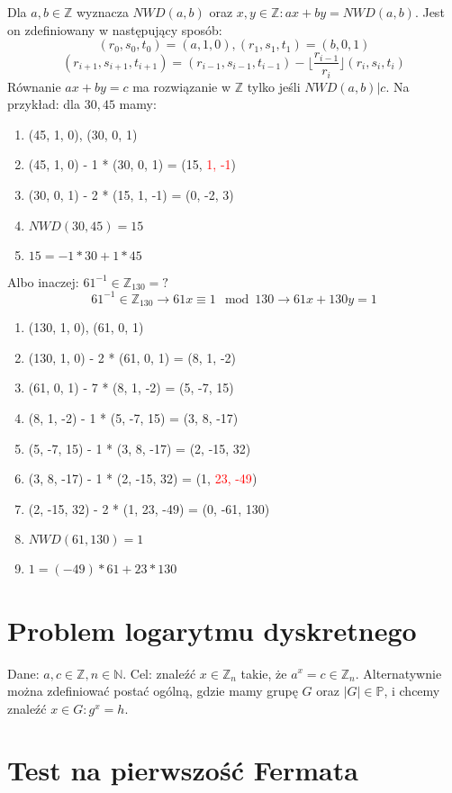 \documentclass{../notatki}
\begin{document}
Dla $a, b \in \mathbb{Z}$ wyznacza $NWD(a, b)$ oraz $x, y \in
\mathbb{Z} : ax + by = NWD(a, b)$. Jest on zdefiniowany w następujący sposób:
$$
(r_0, s_0, t_0) = (a, 1, 0), (r_1, s_1, t_1) = (b, 0, 1)
$$
$$
(r_{i + 1}, s_{i + 1}, t_{i + 1}) = (r_{i - 1}, s_{i - 1}, t_{i - 1}) - \lfloor
\frac{r_{i - 1}}{r_i} \rfloor (r_i, s_i, t_i)
$$
Równanie $ax + by = c$ ma rozwiązanie w $\mathbb{Z}$ tylko jeśli
$NWD(a, b) | c$.
Na przykład: dla $30, 45$ mamy:
\begin{enumerate}
  \item (45, 1, 0), (30, 0, 1)
  \item (45, 1, 0) - 1 * (30, 0, 1) = (15, \textcolor{red}{1, -1})
  \item (30, 0, 1) - 2 * (15, 1, -1) = (0, -2, 3)
  \item $NWD(30, 45) = 15$
  \item $15 = -1 * 30 + 1 * 45$
\end{enumerate}
Albo inaczej: $61^{-1} \in \mathbb{Z}_{130} = ?$
$$
61^{-1} \in \mathbb{Z}_{130} \rightarrow 61x \equiv 1 \mod 130
\rightarrow 61x + 130y = 1
$$
\begin{enumerate}
  \item (130, 1, 0), (61, 0, 1)
  \item (130, 1, 0) - 2 * (61, 0, 1) = (8, 1, -2)
  \item (61, 0, 1) - 7 * (8, 1, -2) = (5, -7, 15)
  \item (8, 1, -2) - 1 * (5, -7, 15) = (3, 8, -17)
  \item (5, -7, 15) - 1 * (3, 8, -17) = (2, -15, 32)
  \item (3, 8, -17) - 1 * (2, -15, 32) = (1, \textcolor{red}{23, -49})
  \item (2, -15, 32) - 2 * (1, 23, -49) = (0, -61, 130)
  \item $NWD(61, 130) = 1$
  \item $1 = (-49) * 61 + 23 * 130$
\end{enumerate}

\section{Problem logarytmu dyskretnego}

Dane: $a, c \in \mathbb{Z}, n \in \mathbb{N}$. Cel: znaleźć $x \in
\mathbb{Z}_n$ takie, że $a^x = c \in \mathbb{Z}_n$. Alternatywnie można
zdefiniować postać ogólną, gdzie mamy grupę $G$ oraz $|G| \in \mathbb{P}$,
i chcemy znaleźć $x \in G : g^x = h$.

\section{Test na pierwszość Fermata}
\end{document}
